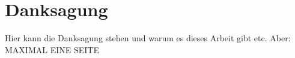 
\thispagestyle{empty} 
\section*{Danksagung}
Hier kann die Danksagung stehen und warum es dieses Arbeit gibt etc.
Aber: MAXIMAL EINE SEITE
\cleardoubleoddpage
